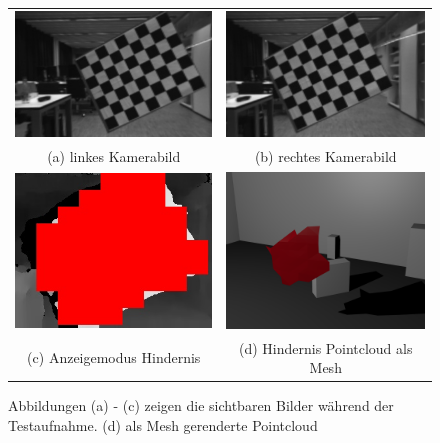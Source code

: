\begin{figure}[h]
	\centering
	\begin{tabular}{cc}
	\includegraphics[width=5.5cm]{img/evaluation/test_set/_test_3_left}&
	\includegraphics[width=5.5cm]{img/evaluation/test_set/_test_3_right}\\
	(a) linkes Kamerabild & (b) rechtes Kamerabild\\
	\includegraphics[width=5.5cm]{img/evaluation/test_set/_test_3_disparity}&
    \includegraphics[width=5.5cm]{img/evaluation/test_set/rendered_obstacle}\\
	(c) Anzeigemodus Hindernis & (d) Hindernis Pointcloud als Mesh
	\end{tabular}
	\caption{Abbildungen (a) - (c) zeigen die sichtbaren Bilder während der Testaufnahme. (d) als Mesh gerenderte Pointcloud}
	\label{fig:test_viewing}
\end{figure}



